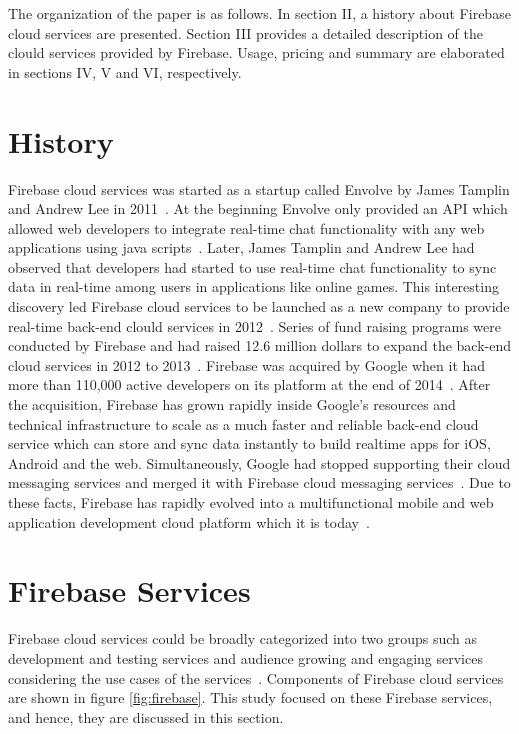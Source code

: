 The organization of the paper is as follows. In section II, a history about
Firebase cloud services are presented. Section III provides a detailed
description of the clould services provided by Firebase. Usage, pricing and
summary are elaborated in sections IV, V and VI, respectively.

\section{History}

Firebase cloud services was started as a startup called Envolve by James Tamplin
and Andrew Lee in 2011~\cite{hid-sp18-409-www-firebase-wikipedia}. At the
beginning Envolve only provided an API which allowed web developers to integrate
real-time chat functionality with any web applications using java
scripts~\cite{hid-sp18-409-www-firebase}. Later, James Tamplin and Andrew Lee
had observed that developers had started to use real-time chat functionality to
sync data in real-time among users in applications like online games. This
interesting discovery led Firebase cloud services to be launched as a new
company to provide real-time back-end clould services in
2012~\cite{hid-sp18-409-www-firebase-wikipedia}. Series of fund raising programs
were conducted by Firebase and had raised 12.6 million dollars to expand the
back-end cloud services in 2012 to 2013~\cite{hid-sp18-409-www-firebase}.
Firebase was acquired by Google when it had more than 110,000 active developers
on its platform  at the end of 2014~\cite{hid-sp18-409-www-firebase-acquired}.
After the acquisition, Firebase has grown rapidly inside Google's resources and
technical infrastructure to scale as a much faster and reliable back-end cloud
service which can store and sync data instantly to build realtime apps for iOS,
Android and the web. Simultaneously, Google had stopped supporting their cloud
messaging services and merged it with Firebase cloud messaging
services~\cite{hid-sp18-409-www-firebase-merged}. Due to these facts, Firebase
has rapidly evolved into a multifunctional mobile and web application
development cloud platform which it is
today~\cite{hid-sp18-409-www-firebase-official}.

\section{Firebase Services}

Firebase cloud services could be broadly categorized into two groups such as
development and testing services and audience growing and engaging services
considering the use cases of the
services~\cite{hid-sp18-409-www-firebase-products}. Components of Firebase cloud
services are shown in figure \ref{fig:firebase}. This study focused on these
Firebase services, and hence, they are discussed in this section.

